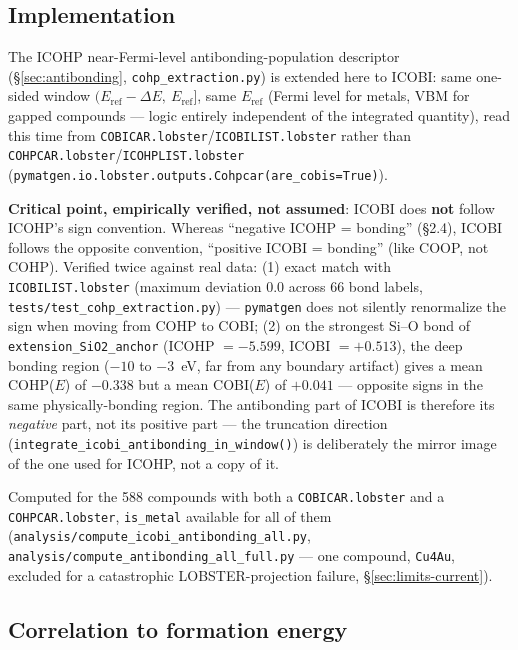 \documentclass[11pt,a4paper]{article}
\begin{document}
\subsection{Implementation}

The ICOHP near-Fermi-level antibonding-population descriptor
(\S\ref{sec:antibonding}, \texttt{cohp\_extraction.py}) is extended
here to ICOBI: same one-sided window
$(E_\text{ref}-\Delta E,\ E_\text{ref}]$, same $E_\text{ref}$ (Fermi
level for metals, VBM for gapped compounds --- logic entirely
independent of the integrated quantity), read this time from
\texttt{COBICAR.lobster}/\texttt{ICOBILIST.lobster} rather than
\texttt{COHPCAR.lobster}/\texttt{ICOHPLIST.lobster}
(\texttt{pymatgen.io.lobster.outputs.Cohpcar(are\_cobis=True)}).

\textbf{Critical point, empirically verified, not assumed}: ICOBI does
\textbf{not} follow ICOHP's sign convention. Whereas ``negative
ICOHP = bonding'' (\S2.4), ICOBI follows the opposite convention,
``positive ICOBI = bonding'' (like COOP, not COHP). Verified
twice against real data: (1) exact match with
\texttt{ICOBILIST.lobster} (maximum deviation 0.0 across 66 bond
labels, \texttt{tests/test\_cohp\_extraction.py}) --- \texttt{pymatgen}
does not silently renormalize the sign when moving from COHP to COBI;
(2) on the strongest Si--O bond of \texttt{extension\_SiO2\_anchor}
(ICOHP $=-5.599$, ICOBI $=+0.513$), the deep bonding region ($-10$ to
$-3$~eV, far from any boundary artifact) gives a mean COHP($E$) of
$-0.338$ but a mean COBI($E$) of $+0.041$ --- opposite signs in the
same physically-bonding region. The antibonding part of ICOBI is
therefore its \emph{negative} part, not its positive part --- the
truncation direction
(\texttt{integrate\_icobi\_antibonding\_in\_window()}) is deliberately
the mirror image of the one used for ICOHP, not a copy of it.

Computed for the 588 compounds with both a \texttt{COBICAR.lobster}
and a \texttt{COHPCAR.lobster}, \texttt{is\_metal} available for all of
them (\texttt{analysis/compute\_icobi\_antibonding\_all.py},
\texttt{analysis/compute\_antibonding\_all\_full.py} --- one compound,
\texttt{Cu4Au}, excluded for a catastrophic LOBSTER-projection failure,
\S\ref{sec:limits-current}).

\subsection{Correlation to formation energy}
\end{document}
